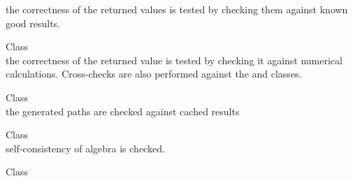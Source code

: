 \begin{DoxyRefList}
\label{test__test000073}%
%
the correctness of the returned values is tested by checking them against known good results. 
\item[Class \doxylink{class_quant_lib_1_1_normal_distribution}{Quant\+Lib\+::Normal\+Distribution} ]\hfill \\
\label{test__test000035}%
%
the correctness of the returned value is tested by checking it against numerical calculations. Cross-\/checks are also performed against the  and  classes.  
\item[Class \doxylink{class_quant_lib_1_1_path_generator}{Quant\+Lib\+::Path\+Generator\texorpdfstring{$<$}{<} GSG \texorpdfstring{$>$}{>}} ]\hfill \\
\label{test__test000085}%
%
the generated paths are checked against cached results  
\item[Class \doxylink{class_quant_lib_1_1_period}{Quant\+Lib\+::Period} ]\hfill \\
\label{test__test000181}%
%
self-\/consistency of algebra is checked.  
\item[Class \doxylink{class_quant_lib_1_1_piecewise_yield_curve}{Quant\+Lib\+::Piecewise\+Yield\+Curve\texorpdfstring{$<$}{<} Traits, Interpolator, Bootstrap \texorpdfstring{$>$}{>}} ]\hfill \\
\label{test__test000166}%
%


\end{DoxyRefList}
